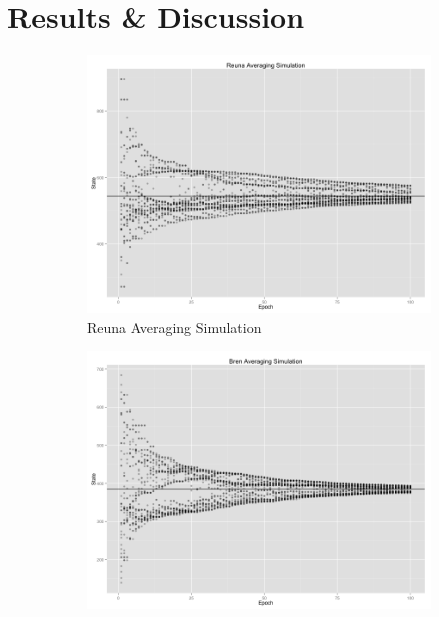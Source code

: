 \section{Results \& Discussion}

\begin{figure}[h!]
	\centering
    \begin{subfigure}[t]{0.47\textwidth}
    \vspace{0pt}
    \includegraphics[width=\linewidth]{figures/Simulation_averaging/ReunaAvgSim.png}
    \caption{Reuna Averaging Simulation}
    \end{subfigure}
    \begin{subfigure}[t]{0.47\textwidth}
    \vspace{0pt}
    \includegraphics[width=\linewidth]{figures/Simulation_averaging/BrenAvgSim.png}

\end{subfigure}
\end{figure}
